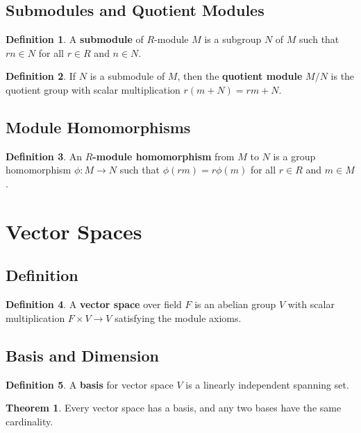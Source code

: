 \documentclass[11pt]{article}
\theoremstyle{definition}
\newtheorem{definition}{Definition}[section]
\newtheorem{theorem}{Theorem}[section]
\begin{document}
\subsection{Submodules and Quotient Modules}
\begin{definition}
A \textbf{submodule} of $R$-module $M$ is a subgroup $N$ of $M$ such that $rn \in N$ for all $r \in R$ and $n \in N$.
\end{definition}

\begin{definition}
If $N$ is a submodule of $M$, then the \textbf{quotient module} $M/N$ is the quotient group with scalar multiplication $r(m + N) = rm + N$.
\end{definition}

\subsection{Module Homomorphisms}
\begin{definition}
An \textbf{$R$-module homomorphism} from $M$ to $N$ is a group homomorphism $\phi: M \to N$ such that $\phi(rm) = r\phi(m)$ for all $r \in R$ and $m \in M$.
\end{definition}

\section{Vector Spaces}

\subsection{Definition}
\begin{definition}
A \textbf{vector space} over field $F$ is an abelian group $V$ with scalar multiplication $F \times V \to V$ satisfying the module axioms.
\end{definition}

\subsection{Basis and Dimension}
\begin{definition}
A \textbf{basis} for vector space $V$ is a linearly independent spanning set.
\end{definition}

\begin{theorem}
Every vector space has a basis, and any two bases have the same cardinality.
\end{theorem}
\end{document}
